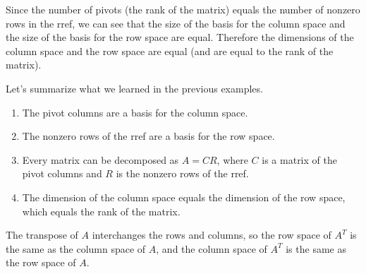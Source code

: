 Since the number of pivots (the rank of the matrix) equals the number of nonzero rows in the rref, we can see that the size of the basis for the column space and the size of the basis for the row space are equal.  Therefore the dimensions of the column space and the row space are equal (and are equal to the rank of the matrix).

Let's summarize what we learned in the previous examples.
\begin{enumerate}
	\item The pivot columns are a basis for the column space. 
	\item The nonzero rows of the rref are a basis for the row space.
	\item Every matrix can be decomposed as $A=CR$, where $C$ is a matrix of the pivot columns and $R$ is the nonzero rows of the rref.
	\item The dimension of the column space equals the dimension of the row space, which equals the rank of the matrix.
\end{enumerate}

The transpose of $A$ interchanges the rows and columns, so the row space of $A^T$ is the same as the column space of $A$, and the column space of $A^T$ is the same as the row space of $A$.
 
